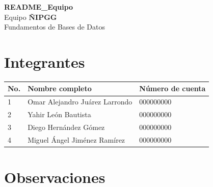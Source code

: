 \documentclass[11pt, letterpaper]{article}
\begin{document}
\begin{center}
    {\LARGE \textbf{README\_Equipo}}\\[0.4cm]
    {\large Equipo \textbf{ÑIPGG}}\\[0.2cm]
    {\large Fundamentos de Bases de Datos}
\end{center}

\vspace{1cm}

\section*{Integrantes}

\begin{center}
\begin{tabular}{lll}
    \textbf{No.} & \textbf{Nombre completo} & \textbf{Número de cuenta} \\
    \hline
    1 & Omar Alejandro Juárez Larrondo & 000000000 \\
    2 & Yahir León Bautista & 000000000 \\
    3 & Diego Hernández Gómez & 000000000 \\
    4 & Miguel Ángel Jiménez Ramírez & 000000000 \\
\end{tabular}
\end{center}

\vspace{1cm}

\section*{Observaciones}

\end{document}
